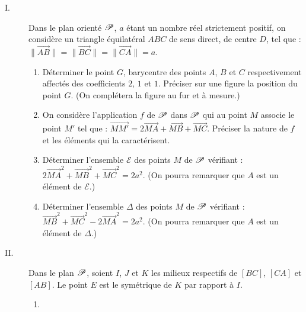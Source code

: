 \begin{exo}\label{exo:sim-triangle-equilateral}
      \begin{description}
            \item[I.]
                  Dans le plan orient\'e $\mathscr{P}$, $a$ \'etant un nombre r\'eel strictement positif,
                  on consid\`ere un triangle \'equilat\'eral $ABC$ de sens direct, de centre $D$, tel que :
                        $\|\overrightarrow{AB}\|=\|\overrightarrow{BC}\|=\|\overrightarrow{CA}\|=a$.
                  \begin{enumerate}
                        \item D\'eterminer le point $G$, barycentre des points $A$, $B$ et $C$
                              respectivement affect\'es des coefficients $2$, $1$ et $1$.
                              Pr\'eciser sur une figure la position du point $G$.
                              (On compl\'etera la figure au fur et \`a mesure.)
                        \item On consid\`ere l'application $f$ de $\mathscr{P}$ dans $\mathscr{P}$ qui 
                              au point $M$ associe le point $M'$ tel que :
                              $\overrightarrow{MM'} = 2 \overrightarrow{MA}+\overrightarrow{MB}+\overrightarrow{MC}$.
                              Pr\'eciser la nature de $f$ et les \'el\'ements qui la caract\'erisent.
                        \item D\'eterminer l'ensemble $\mathcal{E}$ des points $M$ de $\mathscr{P}$ v\'erifiant :
                              $2 \overrightarrow{MA}^2 + \overrightarrow{MB}^2 + \overrightarrow{MC}^2 = 2 a^2$.
                              (On pourra remarquer que $A$ est un \'el\'ement de $\mathcal{E}$.)
                        \item D\'eterminer l'ensemble $\Delta$ des points $M$ de $\mathscr{P}$ v\'erifiant :
                              $\overrightarrow{MB}^2 + \overrightarrow{MC}^2 - 2 \overrightarrow{MA}^2 = 2 a^2$.
                              (On pourra remarquer que $A$ est un \'el\'ement de $\Delta$.)
                  \end{enumerate}
            \item[II.] 
                  Dans le plan $\mathscr{P}$, soient $I$, $J$ et $K$ les milieux respectifs de
                  $[BC]$, $[CA]$ et $[AB]$.
                  Le point $E$ est le sym\'etrique de $K$ par rapport \`a $I$.
                  \begin{enumerate}
                        \item \begin{enumerate}

\end{enumerate}
\end{enumerate}
\end{description}
\end{exo}
